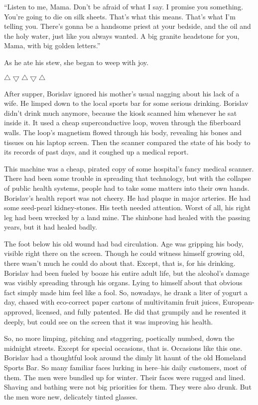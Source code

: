 \documentclass[20 pt,twoside,extrafontsizes,final]{memoir}
\begin{document}
``Listen to me, Mama. Don't be afraid of what I say. I promise you something. You're going to die on silk sheets. That's what this means. That's what I'm telling you. There's gonna be a handsome priest at your bedside, and the oil and the holy water, just like you always wanted. A big granite headstone for you, Mama, with big golden letters.''

As he ate his stew, she began to weep with joy.

\bigskip\centerline{{$\bigtriangleup\bigtriangledown\bigtriangleup\bigtriangledown\bigtriangleup$}}\bigskip

After supper, Borislav ignored his mother's usual nagging about his lack of a wife. He limped down to the local sports bar for some serious drinking. Borislav didn't drink much anymore, because the kiosk scanned him whenever he sat inside it. It used a cheap superconductive loop, woven through the fiberboard walls. The loop's magnetism flowed through his body, revealing his bones and tissues on his laptop screen. Then the scanner compared the state of his body to its records of past days, and it coughed up a medical report.

This machine was a cheap, pirated copy of some hospital's fancy medical scanner. There had been some trouble in spreading that technology, but with the collapse of public health systems, people had to take some matters into their own hands. Borislav's health report was not cheery. He had plaque in major arteries. He had some seed-pearl kidney-stones. His teeth needed attention. Worst of all, his right leg had been wrecked by a land mine. The shinbone had healed with the passing years, but it had healed badly.

The foot below his old wound had bad circulation. Age was gripping his body, visible right there on the screen. Though he could witness himself growing old, there wasn't much he could do about that. Except, that is, for his drinking. Borislav had been fueled by booze his entire adult life, but the alcohol's damage was visibly spreading through his organs. Lying to himself about that obvious fact simply made him feel like a fool. So, nowadays, he drank a liter of yogurt a day, chased with eco-correct paper cartons of multivitamin fruit juices, European-approved, licensed, and fully patented. He did that grumpily and he resented it deeply, but could see on the screen that it was improving his health.

So, no more limping, pitching and staggering, poetically numbed, down the midnight streets. Except for special occasions, that is. Occasions like this one. Borislav had a thoughtful look around the dimly lit haunt of the old Homeland Sports Bar. So many familiar faces lurking in here--his daily customers, most of them. The men were bundled up for winter. Their faces were rugged and lined. Shaving and bathing were not big priorities for them. They were also drunk. But the men wore new, delicately tinted glasses.
\end{document}
